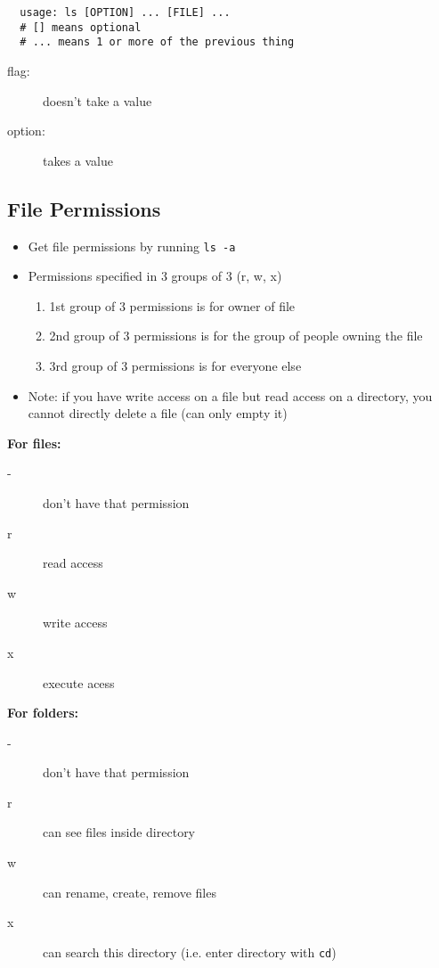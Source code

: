 \documentclass[letterpaper,12pt]{article}
\begin{document}
\begin{lstlisting}
  usage: ls [OPTION] ... [FILE] ...
  # [] means optional
  # ... means 1 or more of the previous thing
\end{lstlisting}

\begin{description}
 \item[flag:] doesn't take a value
 \item[option:] takes a value
\end{description}

\subsection{File Permissions}
\begin{itemize}
 \item Get file permissions by running \lstinline{ls -a}
 \item Permissions specified in 3 groups of 3 (r, w, x)
       \begin{enumerate}
        \item 1st group of 3 permissions is for owner of file
        \item 2nd group of 3 permissions is for the group of people owning the file
        \item 3rd group of 3 permissions is for everyone else
       \end{enumerate}
 \item Note: if you have write access on a file but read access on a directory, you cannot directly delete a file (can only empty it)
\end{itemize}

\textbf{For files:}
\begin{description}
 \item[-] don't have that permission
 \item[r] read access
 \item[w] write access
 \item[x] execute acess
\end{description}

\textbf{For folders:}
\begin{description}
 \item[-] don't have that permission
 \item[r] can see files inside directory
 \item[w] can rename, create, remove files
 \item[x] can search this directory (i.e. enter directory with \lstinline{cd})
\end{description}
\end{document}
